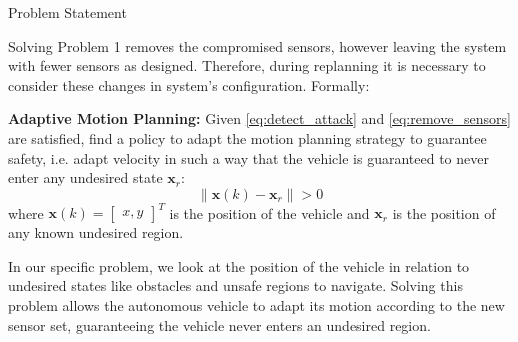 \begin{section}{Problem Statement}
\begin{problem}
\end{problem}
Solving Problem 1 removes the compromised sensors, however leaving the system with fewer sensors as designed. Therefore, during replanning it is necessary to consider these changes in system's configuration. Formally:
	
\begin{problem} \label{problem2} {\textbf{Adaptive Motion Planning:}}
Given \eqref{eq:detect_attack} and \eqref{eq:remove_sensors} are satisfied, find a policy to adapt the motion planning strategy to guarantee safety, i.e. adapt velocity in such a way that the vehicle is guaranteed to never enter any undesired state $\bm{x}_r$:  
	\begin{equation}
		\lVert {\bm{x}(k)-\bm{x}_r} \rVert > 0
	\end{equation}
where $\bm{x}(k)={\begin{bmatrix} x,y \end{bmatrix}}^T$ is the position of the vehicle and $\bm{x}_r$ is the position of any known undesired region.
	\end{problem}

In our specific problem, we look at the position of the vehicle in relation to undesired states like obstacles and unsafe regions to navigate. Solving this problem allows the autonomous vehicle to adapt its motion according to the new sensor set, guaranteeing the vehicle never enters an undesired region.
\end{section}